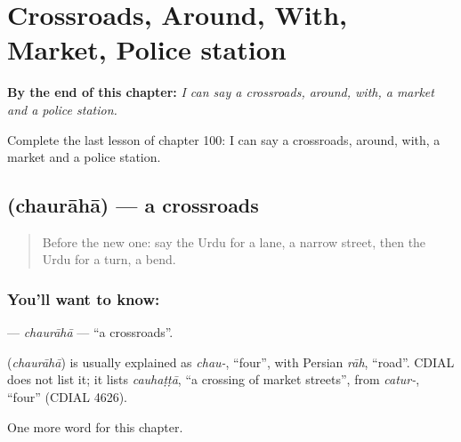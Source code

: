 
\chapter{Crossroads, Around, With, Market, Police station}
\label{ch:ur-crossroads-around-with-market-police-station}

\begin{chapteropening}
\textbf{By the end of this chapter:} \emph{I can say a crossroads, around, with, a market and a police station.}

Complete the last lesson of chapter 100: I can say a crossroads, around, with, a market and a police station.
\end{chapteropening}

\section[\texorpdfstring{\ur{چوراہا} (chaurāhā)}{چوراہا (chaurāhā)}]{ (chaurāhā) — a crossroads}

\label{lesson:UR-C100-chauraha}



\begin{quote}
Before the new one: say the Urdu for a lane, a narrow street, then the Urdu for a turn, a bend.
\end{quote}

\subsection*{You'll want to know: }
\textbf{} — \emph{chaurāhā} — \textquotedblleft{}a crossroads\textquotedblright{}.

\begin{cousinweb}
\textbf{} (\emph{chaurāhā}) is usually explained as \emph{chau-}, \textquotedblleft{}four\textquotedblright{}, with Persian \emph{rāh}, \textquotedblleft{}road\textquotedblright{}. CDIAL does not list it; it lists \emph{cauhaṭṭā}, \textquotedblleft{}a crossing of market streets\textquotedblright{}, from \emph{catur-}, \textquotedblleft{}four\textquotedblright{} (CDIAL 4626).
\end{cousinweb}

\begin{grammarlens}[title={What you've built}]
One more word for this chapter.
\end{grammarlens}

